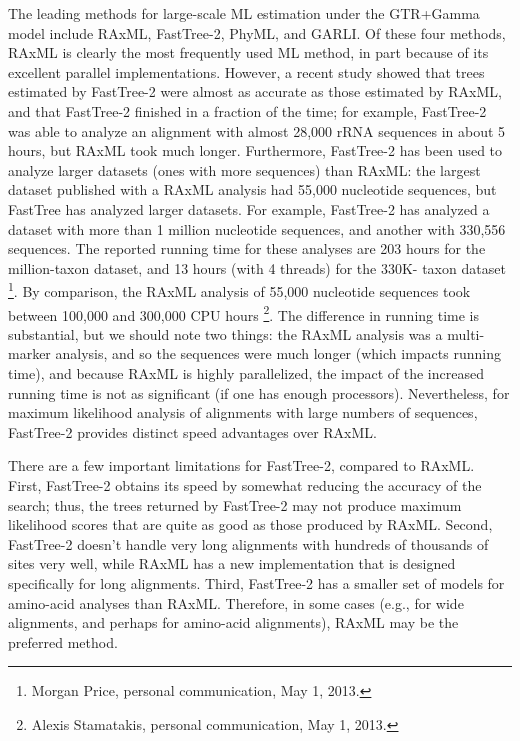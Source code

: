 The leading methods for large-scale ML estimation under the 
GTR+Gamma model include RAxML, FastTree-2, PhyML, and GARLI. 
Of these four methods, RAxML is clearly the most frequently 
used ML method, in part because of its excellent parallel 
implementations. However, a recent study showed that trees 
estimated by FastTree-2 were almost as accurate as those 
estimated by RAxML, and that FastTree-2 finished in a 
fraction of the time; for example, FastTree-2 was able to 
analyze an alignment with almost 28,000 rRNA sequences 
in about 5 hours, but RAxML took much longer. 
Furthermore, FastTree-2 has been used to analyze larger 
datasets (ones with more sequences) than RAxML: the 
largest dataset published with a RAxML analysis 
had 55,000 nucleotide sequences, but FastTree has 
analyzed larger datasets. For example, FastTree-2 
has analyzed a dataset with more than 1 million nucleotide 
sequences, and another with 330,556 sequences. 
The reported running time for these analyses are 203 
hours for the million-taxon dataset, and 13 hours 
(with 4 threads) for the 330K- taxon dataset 
\footnote{Morgan Price, personal communication, May 1, 2013.}. 
By comparison, the RAxML analysis of 55,000 nucleotide 
sequences took between 100,000 and 300,000 CPU hours
\footnote{Alexis Stamatakis, personal communication, May 1, 2013.}. 
The difference in running time is substantial, but we 
should note two things: the RAxML analysis was a 
multi-marker analysis, and so the sequences were much 
longer (which impacts running time), and because RAxML 
is highly parallelized, the impact of the increased running 
time is not as significant (if one has enough processors). 
Nevertheless, for maximum likelihood analysis of alignments 
with large numbers of sequences, FastTree-2 provides 
distinct speed advantages over RAxML.  

There are a few important limitations for FastTree-2, 
compared to RAxML. First, FastTree-2 obtains its speed by 
somewhat reducing the accuracy of the search; thus, the 
trees returned by FastTree-2 may not produce maximum 
likelihood scores that are quite as good as those produced 
by RAxML. Second, FastTree-2 doesn't handle very long 
alignments with hundreds of thousands of sites very well, 
while RAxML has a new implementation that is designed 
specifically for long alignments. Third, FastTree-2 has a 
smaller set of models for amino-acid analyses than RAxML. 
Therefore, in some cases (e.g., for wide alignments, 
and perhaps for amino-acid alignments), RAxML may 
be the preferred method. 

